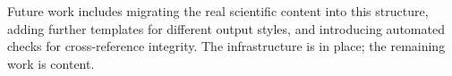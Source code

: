 Future work includes migrating the real scientific content into this
structure, adding further templates for different output styles, and
introducing automated checks for cross-reference integrity. The
infrastructure is in place; the remaining work is content.
